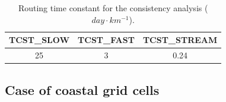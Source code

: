\begin{table}[h]
\centering
\begin{tabular}{|c|c|c|}
\hline
\textbf{TCST\_SLOW} & \textbf{TCST\_FAST} & \textbf{TCST\_STREAM} \\ \hline
25            & 3             & 0.24            \\ \hline
\end{tabular}
\caption{Routing time constant for the consistency analysis ($day \cdot km^{-1}$).}
\label{table:tcst_consistency}
\end{table}

\subsection{Case of coastal grid cells}
\label{sec:coastal_grid_cells}

